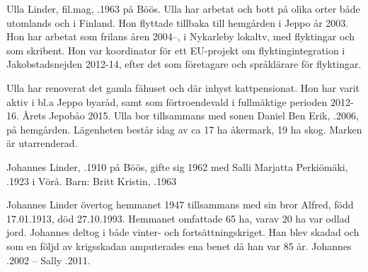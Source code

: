 
Ulla Linder, fil.mag,  .1963 på Böös. Ulla har arbetat och bott på olika orter både utomlands och i Finland. Hon flyttade tillbaka till hemgården i Jeppo år 2003. Hon har arbetat som frilans åren 2004--, i Nykarleby lokaltv, med flyktingar och som skribent. Hon var koordinator för ett EU-projekt om flyktingintegration i Jakobstadsnejden 2012-14, efter det som företagare och språklärare för flyktingar.


Ulla har renoverat det gamla fähuset och där inhyst kattpensionat. Hon har varit aktiv i bl.a Jeppo byaråd, samt som förtroendevald i fullmäktige perioden 2012-16. Årets Jepobåo 2015. Ulla bor tillsammans med sonen Daniel Ben Erik, .2006, på hemgården. Lägenheten består idag av ca 17 ha åkermark, 19 ha skog. Marken är utarrenderad.


Johannes Linder, .1910 på Böös, gifte sig 1962 med Salli Marjatta Perkiömäki, .1923 i Vörå.
Barn: Britt  Kristin, .1963

Johannes Linder övertog hemmanet 1947 tillsammans med sin bror Alfred, född 17.01.1913, död 27.10.1993. Hemmanet omfattade 65 ha, varav 20 ha var odlad jord. Johannes deltog i både vinter- och fortsättningskriget. Han blev skadad och som en följd av krigsskadan amputerades ena benet då han var 85 år.
Johannes .2002  --  Sally .2011.


